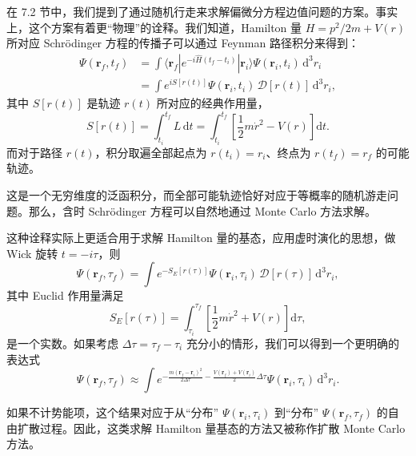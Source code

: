 在 7.2 节中，我们提到了通过随机行走来求解偏微分方程边值问题的方案。事实上，这个方案有着更“物理”的诠释。我们知道，Hamilton 量 $H=p^2/2m+V(r)$ 所对应 Schrödinger 方程的传播子可以通过 Feynman 路径积分来得到：
\begin{equation}
\begin{aligned}
\Psi(\mathbf r_f,t_f)
&=\int \langle \mathbf r_f|e^{-i\hat H(t_f-t_i)}|\mathbf r_i\rangle\Psi(\mathbf r_i,t_i)\,\mathrm d^3r_i\\
&=\int e^{iS[r(t)]}\Psi(\mathbf r_i,t_i)\,\mathcal D[r(t)]\,\mathrm d^3r_i,
\end{aligned}
\tag{7.6.20}
\end{equation}
其中 $S[r(t)]$ 是轨迹 $r(t)$ 所对应的经典作用量，
\begin{equation}
S[r(t)]=\int_{t_i}^{t_f}L\,\mathrm dt=\int_{t_i}^{t_f}\left[\frac12m\dot r^2-V(r)\right]\mathrm dt.
\tag{7.6.21}
\end{equation}
而对于路径 $r(t)$，积分取遍全部起点为 $r(t_i)=r_i$、终点为 $r(t_f)=r_f$ 的可能轨迹。

这是一个无穷维度的泛函积分，而全部可能轨迹恰好对应于等概率的随机游走问题。那么，含时 Schrödinger 方程可以自然地通过 Monte Carlo 方法求解。

这种诠释实际上更适合用于求解 Hamilton 量的基态，应用虚时演化的思想，做 Wick 旋转 $t=-i\tau$，则
\begin{equation}
\Psi(\mathbf r_f,\tau_f)=\int e^{-S_E[r(\tau)]}\Psi(\mathbf r_i,\tau_i)\,\mathcal D[r(\tau)]\,\mathrm d^3r_i,
\tag{7.6.22}
\end{equation}
其中 Euclid 作用量满足
\begin{equation}
S_E[r(\tau)]=\int_{\tau_i}^{\tau_f}\left[\frac12m\dot r^2+V(r)\right]\mathrm d\tau,
\tag{7.6.23}
\end{equation}
是一个实数。如果考虑 $\Delta\tau=\tau_f-\tau_i$ 充分小的情形，我们可以得到一个更明确的表达式
\begin{equation}
\Psi(\mathbf r_f,\tau_f)\approx\int e^{-\frac{m(\mathbf r_f-\mathbf r_i)^2}{2\Delta\tau}-\frac{V(\mathbf r_f)+V(\mathbf r_i)}2\Delta\tau}\Psi(\mathbf r_i,\tau_i)\,\mathrm d^3r_i.
\tag{7.6.24}
\end{equation}

如果不计势能项，这个结果对应于从“分布” $\Psi(\mathbf r_i,\tau_i)$ 到“分布” $\Psi(\mathbf r_f,\tau_f)$ 的自由扩散过程。因此，这类求解 Hamilton 量基态的方法又被称作扩散 Monte Carlo 方法。

